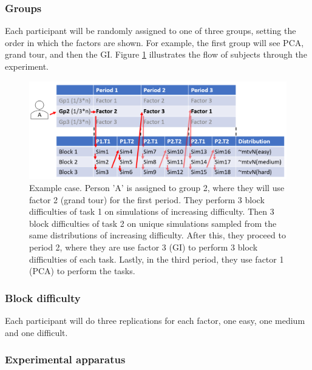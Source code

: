 \documentclass[
  11,
]{article}
\begin{document}
\hypertarget{sec:groups}{%
\subsubsection{Groups}\label{sec:groups}}

Each participant will be randomly assigned to one of three groups, setting the order in which the factors are shown. For example, the first group will see PCA, grand tour, and then the GI. Figure \ref{fig:designExample} illustrates the flow of subjects through the experiment.

\begin{figure}[h]

{\centering \includegraphics[width=1\linewidth,]{./figures/experimental_design_personA} 

}

\caption{Example case. Person 'A' is assigned to group 2, where they will use factor 2 (grand tour) for the first period. They perform 3 block difficulties of task 1 on simulations of increasing difficulty. Then 3 block difficulties of task 2 on unique simulations sampled from the same distributions of increasing difficulty. After this, they proceed to period 2, where they are use factor 3 (GI) to perform 3 block difficulties of each task. Lastly, in the third period, they use factor 1 (PCA) to perform the tasks.}\label{fig:designExample}
\end{figure}

\hypertarget{sec:blocks}{%
\subsubsection{Block difficulty}\label{sec:blocks}}

Each participant will do three replications for each factor, one easy, one medium and one difficult.

\hypertarget{experimental-apparatus}{%
\subsubsection{Experimental apparatus}\label{experimental-apparatus}}
\end{document}
